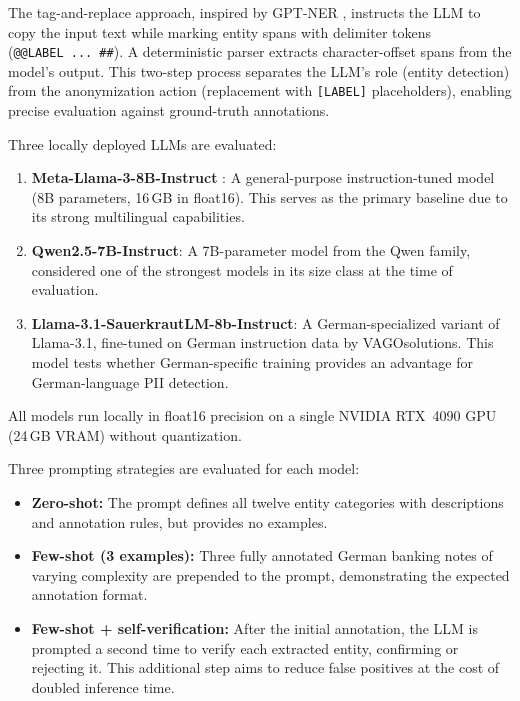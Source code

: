 The tag-and-replace approach, inspired by GPT-NER \citep{wang2023gptner},
instructs the LLM to copy the input text while marking entity spans with
delimiter tokens (\texttt{@@LABEL~...~\#\#}). A deterministic parser extracts
character-offset spans from the model's output. This two-step process separates
the LLM's role (entity detection) from the anonymization action (replacement
with \texttt{[LABEL]} placeholders), enabling precise evaluation against
ground-truth annotations.

Three locally deployed LLMs are evaluated:

\begin{enumerate}
    \item \textbf{Meta-Llama-3-8B-Instruct} \citep{dubey2024llama3}: A
    general-purpose instruction-tuned model (8B parameters, 16\,GB in float16).
    This serves as the primary baseline due to its strong multilingual
    capabilities.

    \item \textbf{Qwen2.5-7B-Instruct}: A 7B-parameter model from the Qwen
    family, considered one of the strongest models in its size class at the time
    of evaluation.

    \item \textbf{Llama-3.1-SauerkrautLM-8b-Instruct}: A German-specialized
    variant of Llama-3.1, fine-tuned on German instruction data by VAGOsolutions.
    This model tests whether German-specific training provides an advantage for
    German-language PII detection.
\end{enumerate}

All models run locally in float16 precision on a single NVIDIA RTX~4090 GPU
(24\,GB VRAM) without quantization.

Three prompting strategies are evaluated for each model:

\begin{itemize}
    \item \textbf{Zero-shot:} The prompt defines all twelve entity categories
    with descriptions and annotation rules, but provides no examples.

    \item \textbf{Few-shot (3 examples):} Three fully annotated German banking
    notes of varying complexity are prepended to the prompt, demonstrating the
    expected annotation format.

    \item \textbf{Few-shot + self-verification:} After the initial annotation,
    the LLM is prompted a second time to verify each extracted entity, confirming
    or rejecting it. This additional step aims to reduce false positives at the
    cost of doubled inference time.
\end{itemize}

